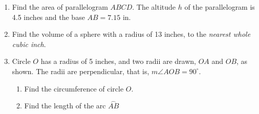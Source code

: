 \begin{enumerate}
\item Find the area of parallelogram $ABCD$. The altitude $h$ of the parallelogram is 4.5 inches and the base $AB=7.15$ in.\\[1cm]
   \vspace{2cm}

\item Find the volume of a sphere with a radius of 13 inches, to the \emph{nearest whole cubic inch}. \vspace{3cm}

\item Circle $O$ has a radius of 5 inches, and two radii are drawn, $OA$ and $OB$, as shown. The radii are perpendicular, that is, $m\angle AOB=90^\circ$.\\
\begin{enumerate}
  \item Find the circumference of circle $O$. \vspace{1.5cm}
  \item Find the length of the arc $\stackrel\frown{AB}$
  \end{enumerate}

        
\newpage

\end{enumerate}
